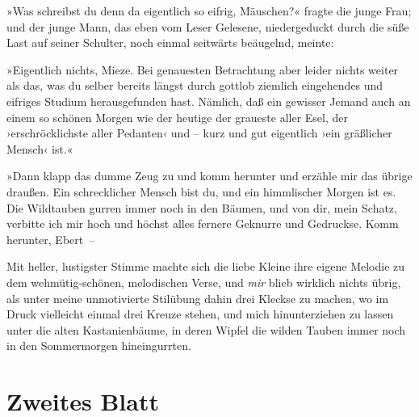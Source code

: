 »Was schreibst du denn da eigentlich so eifrig, Mäuschen?« fragte
die junge Frau; und der junge Mann, das eben vom Leser Gelesene,
niedergeduckt durch die süße Last auf seiner Schulter, noch einmal
seitwärts beäugelnd, meinte:

»Eigentlich nichts, Mieze. Bei genauesten Betrachtung aber leider
nichts weiter als das, was du selber bereits längst durch gottlob
ziemlich eingehendes und eifriges Studium herausgefunden hast.
Nämlich, daß ein gewisser Jemand auch an einem so schönen Morgen
wie der heutige der graueste aller Esel, der ›erschröcklichste
aller Pedanten‹ und – kurz und gut eigentlich ›ein gräßlicher
Mensch‹ ist.«

»Dann klapp das dumme Zeug zu und komm herunter und erzähle mir das
übrige draußen. Ein schrecklicher Mensch bist du, und ein
himmlischer Morgen ist es. Die Wildtauben gurren immer noch in den
Bäumen, und von dir, mein Schatz, verbitte ich mir hoch und höchst
alles fernere Geknurre und Gedruckse. Komm herunter, Ebert~–

Mit heller, lustigster Stimme machte sich die liebe Kleine ihre
eigene Melodie zu dem wehmütig-schönen, melodischen Verse, und
\emph{mir} blieb wirklich nichts übrig, als unter meine
unmotivierte Stilübung dahin drei Kleckse zu machen, wo im Druck
vielleicht einmal drei Kreuze stehen, und mich hinunterziehen zu
lassen unter die alten Kastanienbäume, in deren Wipfel die wilden
Tauben immer noch in den Sommermorgen hineingurrten.

\section{Zweites Blatt}

